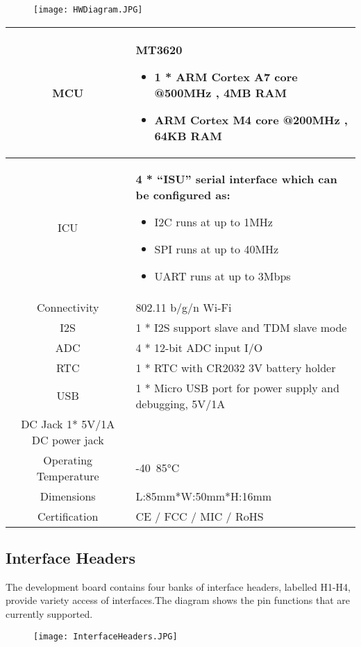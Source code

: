  \begin{figure}[h]
     \texttt{[image: HWDiagram.JPG]}
 \end{figure}

 \begin{tabular}{c l} 
     MCU & 
     \begin{minipage}[t]{0.4\textwidth}
        \textbf{MT3620}
        \begin{itemize}
        \item 1 * ARM Cortex A7 core @500MHz , 4MB RAM
        \item ARM Cortex M4 core @200MHz , 64KB RAM
        \end{itemize}
      \end{minipage} \\
      \hline
     ICU & 
     \begin{minipage}[t]{0.4\textwidth}
        \textbf{4 * “ISU” serial interface which can be configured as:}
        \begin{itemize}
        \item I2C runs at up to 1MHz
        \item SPI runs at up to 40MHz
        \item UART runs at up to 3Mbps
        \end{itemize}
      \end{minipage} \\
      \hline
      Connectivity & 802.11 b/g/n Wi-Fi \\
      \hline
      I2S & 1 * I2S support slave and TDM slave mode \\
      \hline
      ADC & 4 * 12-bit ADC input I/O \\
      \hline
      RTC & 1 * RTC with CR2032 3V battery holder \\
      \hline
      USB & 1 * Micro USB port for power supply and debugging, 5V/1A \\
      \hline
      DC Jack 1* 5V/1A DC power jack \\
      \hline
      Operating Temperature & -40~85°C \\
      \hline
      Dimensions & L:85mm*W:50mm*H:16mm \\
      \hline
      Certification & CE / FCC / MIC / RoHS \\
 \end{tabular}

\subsection{Interface Headers}
The development board contains four banks of interface headers, labelled H1-H4, provide variety access of interfaces.The diagram shows 
the pin functions that are currently supported.
\begin{figure}[h]
    \texttt{[image: InterfaceHeaders.JPG]}
\end{figure}
